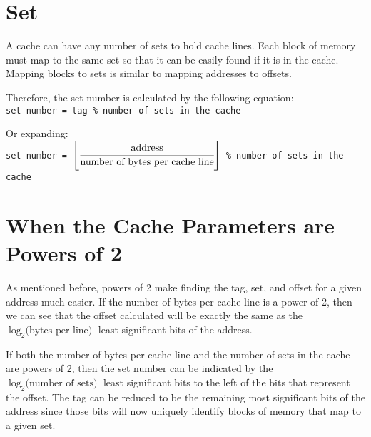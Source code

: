 \documentclass[11pt]{article}
\begin{document}
\section*{Set}
A cache can have any number of sets to hold cache lines.
Each block of memory must map to the same set so that it can be easily found if it is in the cache.
Mapping blocks to sets is similar to mapping addresses to offsets.

Therefore, the set number is calculated by the following equation:\\
\texttt{set number = tag \% number of sets in the cache}

Or expanding:\\
\texttt{set number = $\left\lfloor\cfrac{\text{address}}{\text{number of bytes per cache line}}\right\rfloor$ \% number of sets in the cache}

\section*{When the Cache Parameters are Powers of 2}
As mentioned before, powers of 2 make finding the tag, set, and offset for a given address much easier.
If the number of bytes per cache line is a power of 2, then we can see that the offset calculated will be exactly the same as the \texttt{$\log_2 \text{(bytes per line)}$} least significant bits of the address.

If both the number of bytes per cache line and the number of sets in the cache are powers of 2, then the set number can be indicated by the \texttt{$\log_2 \text{(number of sets)}$} least significant bits to the left of the bits that represent the offset.
The tag can be reduced to be the remaining most significant bits of the address since those bits will now uniquely identify blocks of memory that map to a given set.
\end{document}
